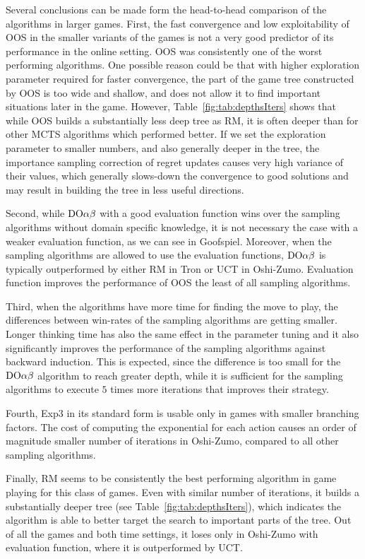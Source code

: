 Several conclusions can be made form the head-to-head comparison of the algorithms in larger games. 
First, the fast convergence and low exploitability of OOS in the smaller variants of the games is not a very good predictor of its performance in the online setting. OOS was consistently one of the worst performing algorithms. One possible reason could be that with higher exploration parameter required for faster convergence, the part of the game tree constructed by OOS is too wide and shallow, and does not allow it to find important situations later in the game. However, Table~\ref{fig:tab:depthsIters} shows that while OOS builds a substantially less deep tree as RM, it is often deeper than for other MCTS algorithms which performed better. If we set the exploration parameter to smaller numbers, and also generally deeper in the tree, the importance sampling correction of regret updates causes very high variance of their values, which generally slows-down the convergence to good solutions and may result in building the tree in less useful directions.

Second, while $\textrm{DO}\alpha\beta$ with a good evaluation function wins over the sampling algorithms without domain specific knowledge, it is not necessary the case with a weaker evaluation function, as we can see in Goofspiel. Moreover, when the sampling algorithms are allowed to use the evaluation functions, $\textrm{DO}\alpha\beta$ is typically outperformed by either RM in Tron or UCT in Oshi-Zumo. 
Evaluation function improves the performance of OOS the least of all sampling algorithms. 

Third, when the algorithms have more time for finding the move to play, the differences between win-rates of the sampling algorithms are getting smaller. Longer thinking time has also the same effect in the parameter tuning and it also significantly improves the performance of the sampling algorithms against backward induction. This is expected, since the difference is too small for the $\textrm{DO}\alpha\beta$ algorithm to reach greater depth, while it is sufficient for the sampling algorithms to execute $5$ times more iterations that improves their strategy.

Fourth, Exp3 in its standard form is usable only in games with smaller branching factors. The cost of computing the exponential for each action causes an order of magnitude smaller number of iterations in Oshi-Zumo, compared to all other sampling algorithms. 

Finally, RM seems to be consistently the best performing algorithm in game playing for this class of games. Even with similar number of iterations, it builds a substantially deeper tree (see Table~\ref{fig:tab:depthsIters}), which indicates the algorithm is able to better target the search to important parts of the tree. Out of all the games and both time settings, it loses only in Oshi-Zumo with evaluation function, where it is outperformed by UCT.

